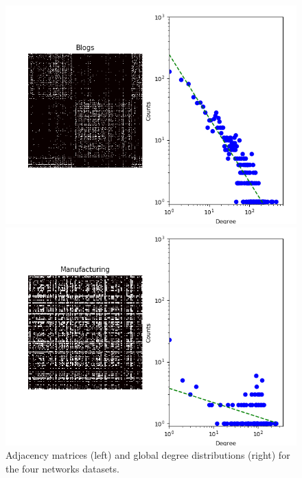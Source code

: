 \begin{figure}[h]
\begin{minipage}{0.24\textwidth}
            \includegraphics[width=\textwidth]{img/corpus/blogs_dd}
        \end{minipage}
        \begin{minipage}{0.24\textwidth}
            \includegraphics[width=\textwidth]{img/corpus/manufacturing_dd}
        \end{minipage}
	\caption{Adjacency matrices (left) and global degree distributions (right) for the four networks datasets.}
	\label{fig:corpuses}
\end{figure}
